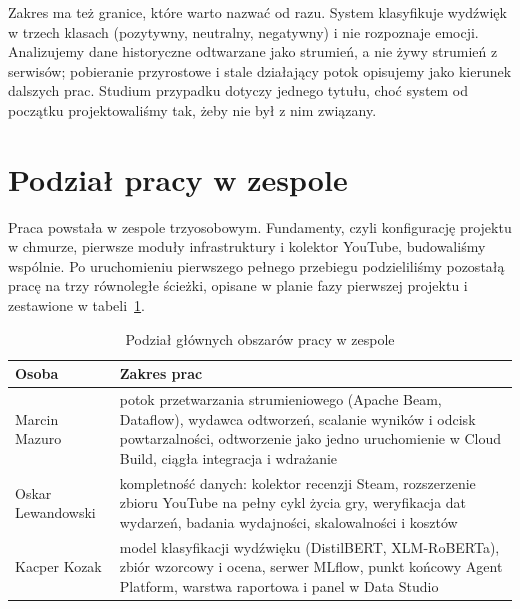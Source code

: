 Zakres ma też granice, które warto nazwać od razu.
System klasyfikuje wydźwięk w trzech klasach (pozytywny, neutralny, negatywny) i nie rozpoznaje emocji.
Analizujemy dane historyczne odtwarzane jako strumień, a nie żywy strumień z serwisów; pobieranie przyrostowe i stale działający potok opisujemy jako kierunek dalszych prac.
Studium przypadku dotyczy jednego tytułu, choć system od początku projektowaliśmy tak, żeby nie był z nim związany.

\section{Podział pracy w zespole}
\label{sec:intro-team}

Praca powstała w zespole trzyosobowym.
Fundamenty, czyli konfigurację projektu w chmurze, pierwsze moduły infrastruktury i kolektor YouTube, budowaliśmy wspólnie.
Po uruchomieniu pierwszego pełnego przebiegu podzieliliśmy pozostałą pracę na trzy równoległe ścieżki, opisane w planie fazy pierwszej projektu i zestawione w tabeli~\ref{tab:team-split}.

\begin{table}[hbp]
  \caption{Podział głównych obszarów pracy w zespole}
  \label{tab:team-split}
  \centering
  \small
  \begin{tabular}{|p{}|p{}|}
    \hline
    Osoba             & Zakres prac                                                                                                                                                                                           \\
    \hline
    Marcin Mazuro     & potok przetwarzania strumieniowego (Apache Beam, Dataflow), wydawca odtworzeń, scalanie wyników i odcisk powtarzalności, odtworzenie jako jedno uruchomienie w Cloud Build, ciągła integracja i wdrażanie \\
    \hline
    Oskar Lewandowski & kompletność danych: kolektor recenzji Steam, rozszerzenie zbioru YouTube na pełny cykl życia gry, weryfikacja dat wydarzeń, badania wydajności, skalowalności i kosztów                                      \\
    \hline
    Kacper Kozak      & model klasyfikacji wydźwięku (DistilBERT, XLM-RoBERTa), zbiór wzorcowy i ocena, serwer MLflow, punkt końcowy Agent Platform, warstwa raportowa i panel w Data Studio                                       \\
    \hline
  \end{tabular}
\end{table}


